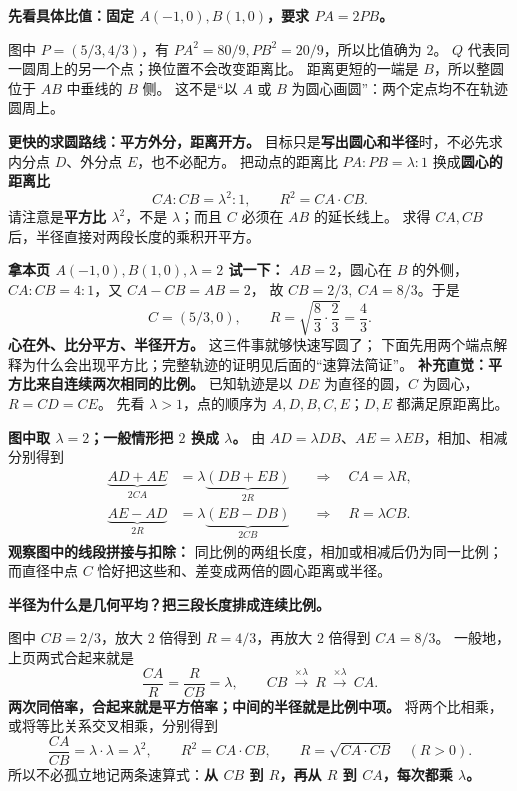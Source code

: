 \clearpage
\begin{explanationbox}
\textbf{先看具体比值：固定 $A(-1,0),B(1,0)$，要求 $PA=2PB$。}

图中 $P=(5/3,4/3)$，有 $PA^2=80/9,PB^2=20/9$，所以比值确为 $2$。
$Q$ 代表同一圆周上的另一个点；换位置不会改变距离比。
距离更短的一端是 $B$，所以整圆位于 $AB$ 中垂线的 $B$ 侧。
这不是“以 $A$ 或 $B$ 为圆心画圆”：两个定点均不在轨迹圆周上。

\tcbbreak
\textbf{更快的求圆路线：平方外分，距离开方。}
目标只是\textbf{写出圆心和半径}时，不必先求内分点 $D$、外分点 $E$，也不必配方。
把动点的距离比 $PA:PB=\lambda:1$ 换成\textbf{圆心的距离比}
\[
 \boxed{CA:CB=\lambda^2:1},\qquad \boxed{R^2=CA\cdot CB}.
\]
请注意是\textbf{平方比 $\lambda^2$}，不是 $\lambda$；而且 $C$ 必须在 $AB$ 的延长线上。
求得 $CA,CB$ 后，半径直接对两段长度的乘积开平方。

\textbf{拿本页 $A(-1,0),B(1,0),\lambda=2$ 试一下：}
$AB=2$，圆心在 $B$ 的外侧，$CA:CB=4:1$，又 $CA-CB=AB=2$，
故 $CB=2/3,\ CA=8/3$。于是
\[
 C=(5/3,0),\qquad R=\sqrt{\frac83\cdot\frac23}=\frac43.
\]
\textbf{心在外、比分平方、半径开方。} 这三件事就够快速写圆了；
下面先用两个端点解释为什么会出现平方比；完整轨迹的证明见后面的“速算法简证”。
\tcbbreak
\textbf{补充直觉：平方比来自连续两次相同的比例。}
已知轨迹是以 $DE$ 为直径的圆，$C$ 为圆心，$R=CD=CE$。
先看 $\lambda>1$，点的顺序为 $A,D,B,C,E$；$D,E$ 都满足原距离比。

\textbf{图中取 $\lambda=2$；一般情形把 $2$ 换成 $\lambda$。}
由 $AD=\lambda DB$、$AE=\lambda EB$，相加、相减分别得到
\[
\begin{aligned}
 \underbrace{AD+AE}_{2CA}
 &=\lambda\underbrace{(DB+EB)}_{2R}
 &&\Longrightarrow\quad CA=\lambda R,\\[4pt]
 \underbrace{AE-AD}_{2R}
 &=\lambda\underbrace{(EB-DB)}_{2CB}
 &&\Longrightarrow\quad R=\lambda CB.
\end{aligned}
\]
\textbf{观察图中的线段拼接与扣除：} 同比例的两组长度，相加或相减后仍为同一比例；
而直径中点 $C$ 恰好把这些和、差变成两倍的圆心距离或半径。

\tcbbreak
\textbf{半径为什么是几何平均？把三段长度排成连续比例。}

图中 $CB=2/3$，放大 $2$ 倍得到 $R=4/3$，再放大 $2$ 倍得到 $CA=8/3$。
一般地，上页两式合起来就是
\[
 \boxed{\frac{CA}{R}=\frac{R}{CB}=\lambda},\qquad
 CB\ \xrightarrow{\times\lambda}\ R\ \xrightarrow{\times\lambda}\ CA.
\]
\textbf{两次同倍率，合起来就是平方倍率；中间的半径就是比例中项。}
将两个比相乘，或将等比关系交叉相乘，分别得到
\[
 \frac{CA}{CB}=\lambda\cdot\lambda=\lambda^2,
 \qquad R^2=CA\cdot CB,
 \qquad R=\sqrt{CA\cdot CB}\quad(R>0).
\]
所以不必孤立地记两条速算式：\textbf{从 $CB$ 到 $R$，再从 $R$ 到 $CA$，每次都乘 $\lambda$。}


\end{explanationbox}
